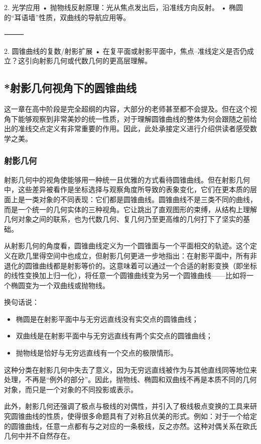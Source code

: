2. 光学应用
	•	抛物线反射原理：光从焦点发出后，沿准线方向反射。
	•	椭圆的“耳语墙”性质，双曲线的导航应用等。

⸻


2. 圆锥曲线的复数/射影扩展
	•	在复平面或射影平面中，焦点–准线定义是否仍成立？这引向射影几何或代数几何的更高层理解。


\subsection{*射影几何视角下的圆锥曲线}\label{sub_HsCsFD_1}

这一章在高中阶段是完全超纲的内容，大部分的老师甚至都不会提及。但在这个视角下能够观察到非常美妙的统一性质，对于理解圆锥曲线的整体为何会跟随之前给出的准线交点定义有非常重要的作用。因此，此处承接定义进行介绍供读者感受数学之美。


\subsubsection{射影几何}



射影几何中的视角使能够用一种统一且优雅的方式看待圆锥曲线。但在射影几何中，这些差异被看作是坐标选择与观察角度所导致的表象变化，它们在更本质的层面上是一类对象的不同表现：它们都是圆锥曲线。圆锥曲线不是三类不同的曲线，而是一个统一的几何实体的三种视角。它让跳出了直观图形的束缚，从结构上理解几何对象之间的联系，也为代数几何、复几何乃至更高维的几何打下了坚实的基础。

从射影几何的角度看，圆锥曲线定义为一个圆锥面与一个平面相交的轨迹。这个定义在欧几里得空间中也成立，但射影几何更进一步地指出：在射影平面中，所有非退化的圆锥曲线都是射影等价的。这意味着可以通过一个合适的射影变换（即坐标的线性变换加上归一化），将任意一个圆锥曲线变为另一个圆锥曲线——比如将一个椭圆变为一个双曲线或抛物线。

换句话说：
\begin{itemize}
\item 椭圆是在射影平面中与无穷远直线没有实交点的圆锥曲线；
\item 双曲线是在射影平面中与无穷远直线有两个实交点的圆锥曲线；
\item 抛物线是恰好与无穷远直线有一个交点的极限情形。
\end{itemize}

这种分类在射影几何中失去了意义，因为无穷远直线被作为与其他直线同等地位来处理，不再是“例外的部分”。因此，抛物线、椭圆和双曲线不再是本质不同的几何对象，而只是一个对象的不同投影或表示。

此外，射影几何还强调了极点与极线的对偶性，并引入了极线极点变换的工具来研究圆锥曲线的性质，使得很多命题具有了对称且优美的形式。例如：对于一个给定的圆锥曲线，任意一点都有与之对应的一条极线，反之亦然。这种对偶关系在欧氏几何中并不自然存在。



